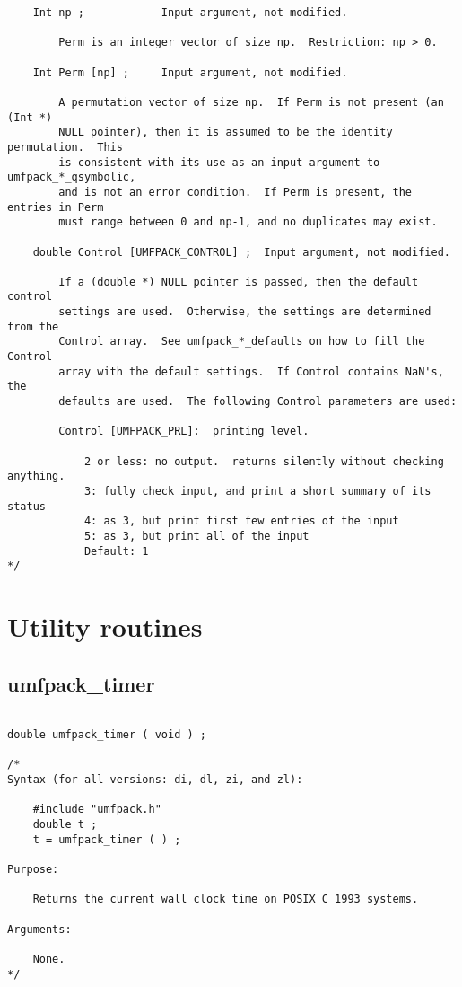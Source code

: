 \documentclass[11pt]{article}
\begin{document}
{\begin{verbatim}
    Int np ;            Input argument, not modified.

        Perm is an integer vector of size np.  Restriction: np > 0.

    Int Perm [np] ;     Input argument, not modified.

        A permutation vector of size np.  If Perm is not present (an (Int *)
        NULL pointer), then it is assumed to be the identity permutation.  This
        is consistent with its use as an input argument to umfpack_*_qsymbolic,
        and is not an error condition.  If Perm is present, the entries in Perm
        must range between 0 and np-1, and no duplicates may exist.

    double Control [UMFPACK_CONTROL] ;  Input argument, not modified.

        If a (double *) NULL pointer is passed, then the default control
        settings are used.  Otherwise, the settings are determined from the
        Control array.  See umfpack_*_defaults on how to fill the Control
        array with the default settings.  If Control contains NaN's, the
        defaults are used.  The following Control parameters are used:

        Control [UMFPACK_PRL]:  printing level.

            2 or less: no output.  returns silently without checking anything.
            3: fully check input, and print a short summary of its status
            4: as 3, but print first few entries of the input
            5: as 3, but print all of the input
            Default: 1
*/
\end{verbatim}
}

\newpage
\section{Utility routines}
\label{Utility}

\subsection{umfpack\_timer}

{\footnotesize
\begin{verbatim}

double umfpack_timer ( void ) ;

/*
Syntax (for all versions: di, dl, zi, and zl):

    #include "umfpack.h"
    double t ;
    t = umfpack_timer ( ) ;

Purpose:

    Returns the current wall clock time on POSIX C 1993 systems.

Arguments:

    None.
*/
\end{verbatim}
}
\end{document}
